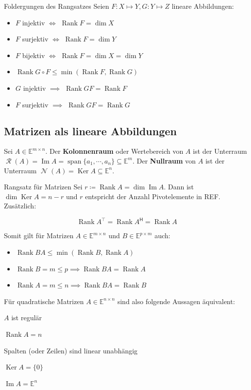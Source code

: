 \documentclass[a4paper,10pt]{article}
\DeclareMathOperator{\Rank}{Rank}
\DeclareMathOperator{\Image}{Im}
\DeclareMathOperator{\Columnspace}{\mathcal{R}}
\DeclareMathOperator{\Nullspace}{\mathcal{N}}
\DeclareMathOperator{\Kernel}{Ker}
\DeclareMathOperator{\Span}{span}
\newcommand*{\hermconj}{\mathsf{H}}
\def\E{\mathbb{E}}
\begin{document}
\begin{subbox}{Foldergungen des Rangsatzes}
  Seien $F: X \mapsto Y, G: Y \mapsto Z$ lineare Abbildungen:
  \begin{itemize}
    \item $F$ injektiv $\iff$ $\Rank F = \dim X$
    \item $F$ surjektiv $\iff$ $\Rank F = \dim Y$
    \item $F$ bijektiv $\iff$ $\Rank F = \dim X = \dim Y$
    \item $\Rank G \circ F \leq \min(\Rank F, \Rank G)$
    \item $G$ injektiv $\implies$ $\Rank GF = \Rank F$
    \item $F$ surjektiv $\implies$ $\Rank GF = \Rank G$
  \end{itemize}
\end{subbox}

\subsection{Matrizen als lineare Abbildungen}

Sei $A \in \E^{m \times n}$. Der \textbf{Kolonnenraum} oder Wertebereich von $A$ ist der Unterraum $\Columnspace(A) = \Image A = \Span \{ a_1, \cdots, a_n \} \subseteq \E^m$. Der \textbf{Nullraum} von $A$ ist der Unterraum $\Nullspace(A) = \Kernel A \subseteq \E^n$.


\begin{subbox}{Rangsatz für Matrizen}
  Sei $r \coloneqq \Rank A = \dim \Image A$. Dann ist $\dim \Kernel A = n - r$ und $r$ entspricht der Anzahl Pivotelemente in REF. Zusätzlich:
  
  $$\Rank A^\top = \Rank A^\hermconj = \Rank A$$
\end{subbox}

Somit gilt für Matrizen $A \in \E^{m \times n}$ und $B \in \E^{p \times m}$ auch:

\begin{itemize}
  \item $\Rank BA \leq \min(\Rank B, \Rank A)$
  \item $\Rank B = m \leq p \implies \Rank BA = \Rank A$
  \item $\Rank A = m \leq n \implies \Rank BA = \Rank B$
\end{itemize}

Für quadratische Matrizen $A \in \E^{n \times n}$ sind also folgende Aussagen äquivalent:

\begin{rowlist}
  \item $A$ ist regulär
  \item $\Rank A = n$
  \item Spalten (oder Zeilen) sind linear unabhängig
  \item $\Kernel A = \{0\}$
  \item $\Image A = \E^n$
\end{rowlist}
\end{document}
